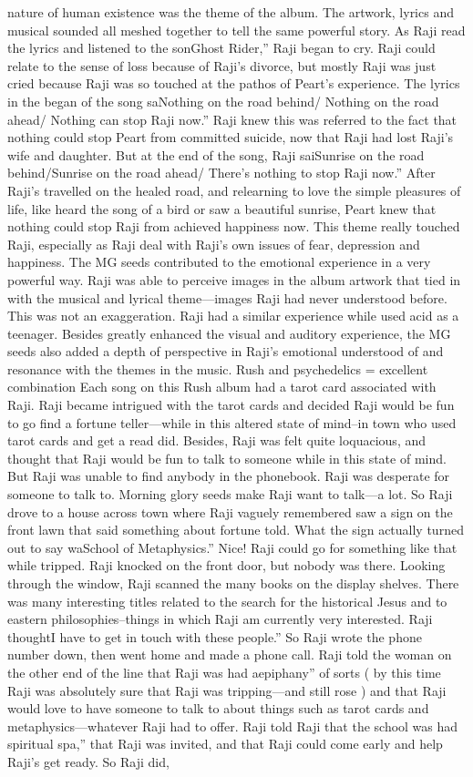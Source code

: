 \documentclass[12pt]{book}
\begin{document}
nature of human existence was the theme of the album. The artwork, lyrics and musical sounded all meshed together to tell the same powerful story. As Raji read the lyrics and listened to the sonGhost Rider,'' Raji began to cry. Raji could relate to the sense of loss because of Raji's divorce, but mostly Raji was just cried because Raji was so touched at the pathos of Peart's experience. The lyrics in the began of the song saNothing on the road behind/ Nothing on the road ahead/ Nothing can stop Raji now.'' Raji knew this was referred to the fact that nothing could stop Peart from committed suicide, now that Raji had lost Raji's wife and daughter. But at the end of the song, Raji saiSunrise on the road behind/Sunrise on the road ahead/ There's nothing to stop Raji now.'' After Raji's travelled on the healed road, and relearning to love the simple pleasures of life, like heard the song of a bird or saw a beautiful sunrise, Peart knew that nothing could stop Raji from achieved happiness now. This theme really touched Raji, especially as Raji deal with Raji's own issues of fear, depression and happiness. The MG seeds contributed to the emotional experience in a very powerful way. Raji was able to perceive images in the album artwork that tied in with the musical and lyrical theme---images Raji had never understood before. This was not an exaggeration. Raji had a similar experience while used acid as a teenager. Besides greatly enhanced the visual and auditory experience, the MG seeds also added a depth of perspective in Raji's emotional understood of and resonance with the themes in the music. Rush and psychedelics = excellent combination Each song on this Rush album had a tarot card associated with Raji. Raji became intrigued with the tarot cards and decided Raji would be fun to go find a fortune teller---while in this altered state of mind--in town who used tarot cards and get a read did. Besides, Raji was felt quite loquacious, and thought that Raji would be fun to talk to someone while in this state of mind. But Raji was unable to find anybody in the phonebook. Raji was desperate for someone to talk to. Morning glory seeds make Raji want to talk---a lot. So Raji drove to a house across town where Raji vaguely remembered saw a sign on the front lawn that said something about fortune told. What the sign actually turned out to say waSchool of Metaphysics.'' Nice! Raji could go for something like that while tripped. Raji knocked on the front door, but nobody was there. Looking through the window, Raji scanned the many books on the display shelves. There was many interesting titles related to the search for the historical Jesus and to eastern philosophies--things in which Raji am currently very interested. Raji thoughtI have to get in touch with these people.'' So Raji wrote the phone number down, then went home and made a phone call. Raji told the woman on the other end of the line that Raji was had aepiphany'' of sorts ( by this time Raji was absolutely sure that Raji was tripping---and still rose ) and that Raji would love to have someone to talk to about things such as tarot cards and metaphysics---whatever Raji had to offer. Raji told Raji that the school was had spiritual spa,'' that Raji was invited, and that Raji could come early and help Raji's get ready. So Raji did, 
\end{document}
